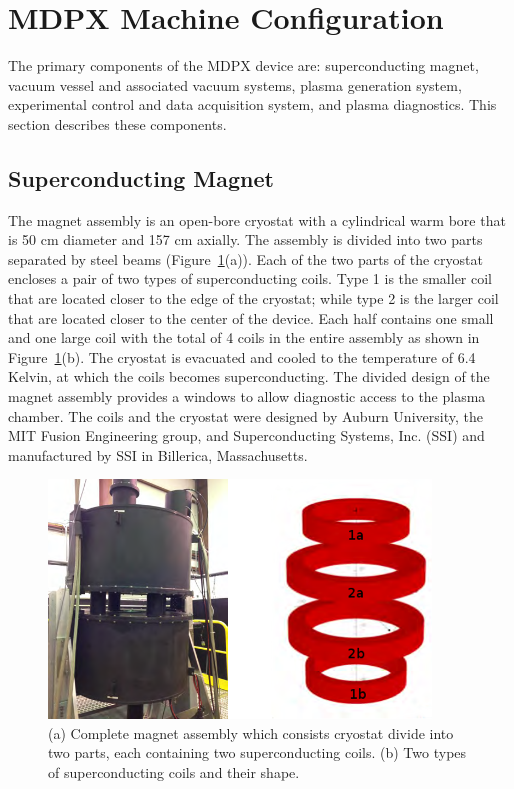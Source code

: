 \section{MDPX Machine Configuration}\label{section-mdpx-config}

The primary components of the MDPX device are: superconducting magnet, vacuum vessel and associated vacuum systems, plasma generation system, experimental control and data acquisition system, and plasma diagnostics. This section describes these components.

\subsection{Superconducting Magnet}

The magnet assembly is an open-bore cryostat with a cylindrical warm bore that is 50 cm diameter and 157 cm axially. The assembly is divided into two parts separated by steel beams (Figure~\ref{coil-layout}(a)). Each of the two parts of the cryostat encloses a pair of two types of superconducting coils. Type 1 is the smaller coil that are located closer to the edge of the cryostat; while type 2 is the larger coil that are located closer to the center of the device. Each half contains one small and one large coil with the total of 4 coils in the entire assembly as shown in Figure~\ref{coil-layout}(b). The cryostat is evacuated and cooled to the temperature of 6.4 Kelvin, at which the coils becomes superconducting. The divided design of the magnet assembly provides a windows to allow diagnostic access to the plasma chamber. The coils and the cryostat were designed by Auburn University, the MIT Fusion Engineering group, and Superconducting Systems, Inc. (SSI) and manufactured by SSI in Billerica, Massachusetts.

\begin{figure}[h!]
\begin{center}
\includegraphics[width=4in]{figures/magnet_assembly.png}
\caption{(a) Complete magnet assembly which consists cryostat divide into two parts, each containing two superconducting coils. (b) Two types of superconducting coils and their shape\cite{PLA:9579370}.\label{coil-layout}}
\end{center}
\end{figure}

